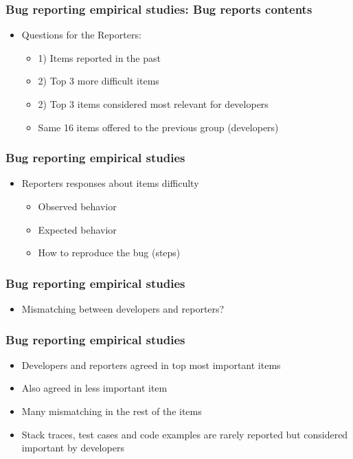\documentclass{beamer}
\begin{document}

\begin{frame}
 \frametitle{Bug reporting empirical studies: Bug reports contents}
 \begin{itemize}
    \item Questions for the Reporters:
      \begin{itemize}
      \item 1) Items reported in the past
      \item 2) Top 3 more difficult items
      \item 2) Top 3 items considered most relevant for developers
      \item Same 16 items offered to the previous group (developers)
      \end{itemize}
 \end{itemize}
\end{frame}


\begin{frame}
 \frametitle{Bug reporting empirical studies}
 \begin{itemize}
    \item Reporters responses about items difficulty
        \begin{itemize}
        \item Observed behavior
        \item Expected behavior
        \item How to reproduce the bug (steps)
        \end{itemize}
 \end{itemize}
\end{frame}


\begin{frame}
 \frametitle{Bug reporting empirical studies}
 \begin{itemize}
    \item Mismatching between developers and reporters?
 \end{itemize}
\end{frame}


\begin{frame}
 \frametitle{Bug reporting empirical studies}
 \begin{itemize}
    \item Developers and reporters agreed in top most important items
    \item Also agreed in less important item
    \item Many mismatching in the rest of the items
    \item Stack traces, test cases and code examples are rarely reported but considered important by developers
 \end{itemize}
\end{frame}
\end{document}
